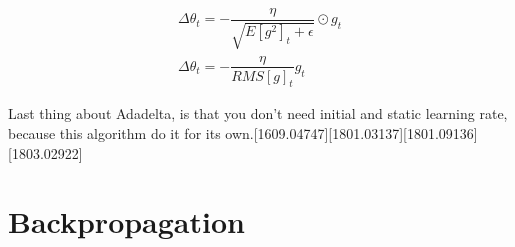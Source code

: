 \begin{equation}
	\begin{split}
			\Delta\theta_t = - \dfrac{\eta}{\sqrt{E[g^2]_t + \epsilon}} \odot g_t \\
			\Delta\theta_t = - \dfrac{\eta}{RMS[g]_t} g_t
	\end{split}
\end{equation}

\noindent Last thing about Adadelta, is that you don't need initial and static learning rate, because this algorithm do it for its own.[1609.04747][1801.03137][1801.09136][1803.02922]

\section{Backpropagation}\label{sec:3.7}
\vspace{-0.5cm}
